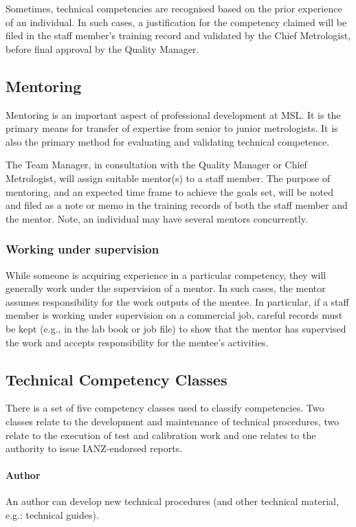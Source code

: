 Sometimes, technical competencies are recognised based on the prior experience of an individual. In such cases, a justification for the competency claimed will be filed in the staff member's training record and validated by the Chief Metrologist, before final approval by the Quality Manager. 

\subsection{Mentoring}
\label{ss:mentoring}
Mentoring is an important aspect of professional development at MSL. It is the primary means for transfer of expertise from senior to junior metrologists. It is also the primary method for evaluating and validating technical competence.

The Team Manager, in consultation with the Quality Manager or Chief Metrologist, will assign suitable mentor(s) to a staff member. The purpose of mentoring, and an expected time frame to achieve the goals set, will be noted and filed as a note or memo in the training records of both the staff member and the mentor. Note, an individual may have several mentors concurrently.

\subsubsection{Working under supervision}
While someone is acquiring experience in a particular competency, they will generally work under the supervision of a mentor. In such cases, the mentor assumes responsibility for the work outputs of the mentee. In particular, if a staff member is working under supervision on a commercial job, careful records must be kept (e.g., in the lab book or job file) to show that the mentor has supervised the work and accepts responsibility for the mentee's activities.

\subsection{Technical Competency Classes}
There is a set of five competency classes used to classify competencies. Two classes relate to the development and maintenance of technical procedures, two relate to the execution of test and calibration work and one relates to the authority to issue IANZ-endorsed reports. 

\paragraph{Author}
An author can develop new technical procedures (and other technical material, e.g.: technical guides).

